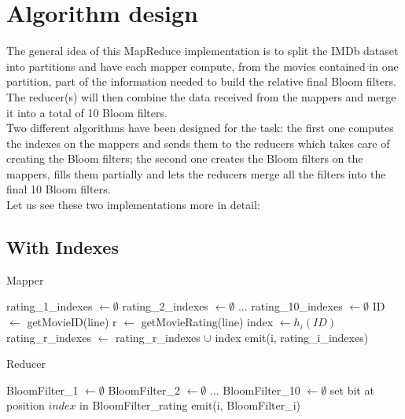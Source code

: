 \section{Algorithm design}
The general idea of this MapReduce implementation is to split the IMDb dataset into partitions and have each mapper compute, from the movies contained in one partition, part of the information needed to build the relative final Bloom filters.
The reducer(s) will then combine the data received from the mappers and merge it into a total of 10 Bloom filters.\\
Two different algorithms have been designed for the task: the first one computes the indexes on the mappers and sends them to the reducers which takes care of creating the Bloom filters; the second one creates the Bloom filters on the mappers, fills them partially and lets the reducers merge all the filters into the final 10 Bloom filters.\\
Let us see these two implementations more in detail:

\subsection{With Indexes}
\begin{algorithm}
	\caption{Mapper} 
	\begin{algorithmic}[1]
			\State rating\_1\_indexes $\gets \emptyset$
			\State rating\_2\_indexes $\gets \emptyset$
			\State ...
			\State rating\_10\_indexes $\gets \emptyset$	
				\State ID $\gets$ getMovieID(line)
				\State r $\gets$ getMovieRating(line)
					\State index $\gets h_{i}(ID)$	
							\State rating\_r\_indexes $\gets$ rating\_r\_indexes $\cup$ index
				\EndFor
			\EndFor
				\State emit(i, rating\_i\_indexes)
			\EndFor
		\EndProcedure
	\end{algorithmic} 
\end{algorithm}

\begin{algorithm}
	\caption{Reducer} 
	\begin{algorithmic}[1]
			\State BloomFilter\_1 $\gets \emptyset$
			\State BloomFilter\_2 $\gets \emptyset$
			\State ...
			\State BloomFilter\_10 $\gets \emptyset$	
				\State set bit at position $index$ in BloomFilter\_rating
			\EndFor
				\State emit(i, BloomFilter\_i)
			\EndFor
		\EndProcedure
	\end{algorithmic} 
\end{algorithm}

